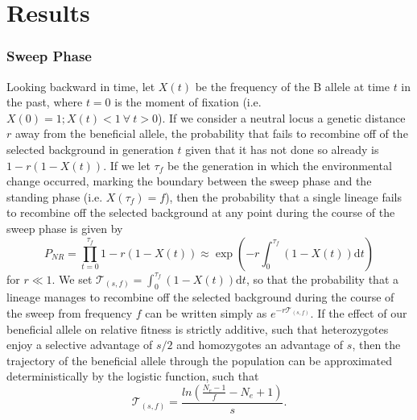 \documentclass[a4paper,10pt]{article}
\begin{document}
\section{Results}

\subsubsection{Sweep Phase}

Looking backward in time, let $X\left(t\right)$ be the frequency of the B allele at time $t$ in the past, where $t=0$ is the moment of fixation (i.e. $X\left(0\right) = 1; X\left(t\right) < 1\ \forall\ t > 0$). If we consider a neutral locus a genetic distance $r$ away from the beneficial allele, the probability that  fails to recombine off of the selected background in generation $t$ given that it has not done so already is $1-r\left(1-X(t)\right)$. If we let $\tau_{f}$ be the generation in which the environmental change occurred, marking the boundary between the sweep phase and the standing phase (i.e. $X\left(\tau_{f}\right) = f$), then the probability that a single lineage fails to recombine off the selected background at any point during the course of the sweep phase is given by
\begin{equation}
P_{NR} = \prod_{t=0}^{\tau_{f}} 1-r\left(1-X(t)\right)  \approx \exp \left(-r \int_0^{\tau_{f}}(1-X\left(t\right))\mathrm{d} t \right)
\end{equation}
for $r \ll 1$. We set  $\mathcal{T}_{\left(s,f\right)} = \int_0^{\tau_{f}}(1-X\left(t\right))\mathrm{d}t$, so that the probability that a lineage manages to recombine off the selected background during the course of the sweep from frequency $f$ can be written simply as $e^{-r\mathcal{T}_{\left(s,f\right)}}$. If the effect of our beneficial allele on relative fitness is strictly additive, such that heterozygotes enjoy a selective advantage of $s/2$ and homozygotes an advantage of $s$, then the trajectory of the beneficial allele through the population can be approximated deterministically by the logistic function, such that 
\begin{equation}
	\mathcal{T}_{\left(s,f\right)} = \frac{ln\left(\frac{N_e - 1}{f}-N_e + 1\right)}{s}.
\end{equation}
\end{document}
